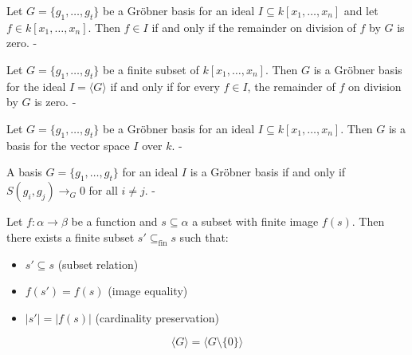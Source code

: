 \begin{lemma}\label{MonomialOrder.groebner_basis_isRemainder_zero_iff_mem_span}

  Let \( G = \{g_1, \dots, g_t\} \) be a Gröbner basis for an ideal \( I \subseteq k[x_1, \dots, x_n] \) and let \( f \in k[x_1, \dots, x_n] \). Then \( f \in I \) if and only if the remainder on division of \( f \) by \( G \) is zero.
-
\end{lemma}

\begin{lemma}\label{MonomialOrder.is_groebner_basis_iff}

  Let \( G = \{g_1, \ldots, g_t\} \) be a finite subset of \( k[x_1, \ldots, x_n] \). Then \( G \) is a Gröbner basis for the ideal \( I = \langle G \rangle \) if and only if  for every \( f \in I \), the remainder of \( f \) on division by \( G \) is zero.
-
\end{lemma}

\begin{lemma}\label{MonomialOrder.groebner_basis_is_basis}

  Let \( G = \{g_1, \ldots, g_t\} \) be a Gröbner basis for an ideal \( I \subseteq k[x_1, \ldots, x_n] \). Then \( G \) is a basis for the vector space \( I \) over \( k \).
-
\end{lemma}

\begin{lemma}\label{MonomialOrder.buchberger_criterion}

  A basis \( G = \{ g_1, \ldots, g_t \} \) for an ideal \( I \) is a Gröbner basis if and only if \( S(g_i, g_j) \to_G 0 \) for all \( i \neq j \).
-
\end{lemma}

\begin{lemma}\label{Set.finset_subset_preimage_of_finite_image}
  \leanok

  Let $f: \alpha \to \beta$ be a function and $s \subseteq \alpha$ a subset with finite image $f(s)$. Then there exists a finite subset $s' \subseteq_{\text{fin}} s$ such that:
\begin{itemize}
\item $s' \subseteq s$ (subset relation)
\item $f(s') = f(s)$ (image equality)
\item $|s'| = |f(s)|$ (cardinality preservation)
\end{itemize}

\end{lemma}

\begin{lemma}\label{Submodule.span_sdiff_singleton_zero}
  \leanok

  \[
\langle G \rangle = \langle G \setminus \{0\} \rangle
\]

\end{lemma}